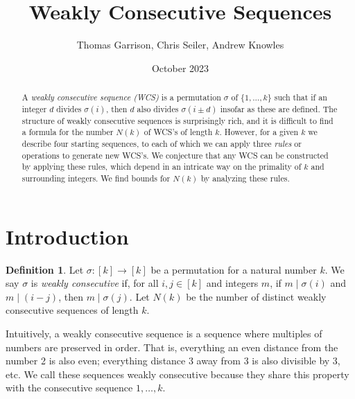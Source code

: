 \documentclass{article}
\title{Weakly Consecutive Sequences}
\author{Thomas Garrison, Chris Seiler, Andrew Knowles}
\date{October 2023} %
\theoremstyle{definition}
\newtheorem{definition}[theorem]{Definition}
\theoremstyle{remark}
\numberwithin{equation}{section}
\numberwithin{case}{theorem}
\begin{document}
\maketitle


\begin{abstract}
A \emph{weakly consecutive sequence (WCS)} is a permutation $\sigma$ of $\{1, \ldots, k\}$ such that if an integer $d$ divides $\sigma(i)$, then $d$ also divides $\sigma(i \pm d)$ insofar as these are defined. The structure of weakly consecutive sequences is surprisingly rich, and it is difficult to find a formula for the number $N(k)$ of WCS's of length $k$. However, for a given $k$ we describe four starting sequences, to each of which we can apply three \emph{rules} or operations to generate new WCS's. We conjecture that any WCS can be constructed by applying these rules, which depend in an intricate way on the primality of $k$ and surrounding integers. We find bounds for $N(k)$ by analyzing these rules.
\end{abstract}
\section{Introduction}
\begin{definition} \label{def:weak_consec}
    Let $\sigma : [k] \to [k]$ be a permutation for a natural number $k$. We say $\sigma$ is \emph{weakly consecutive} if, for all $i,j \in [k]$ and integers $m$, if $m \mid \sigma(i)$ and $m \mid (i - j)$, then $m \mid \sigma(j)$. Let $N(k)$ be the number of distinct weakly consecutive sequences of length $k$.
\end{definition}


Intuitively, a weakly consecutive sequence is a sequence where multiples of numbers are preserved in
order. That is, everything an even distance from the number 2 is also even; everything distance 3
away from 3 is also divisible by 3, etc. We call these sequences weakly consecutive because they share this property with the consecutive sequence $1,\ldots,k$.
\end{document}
